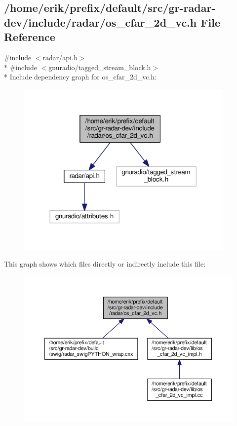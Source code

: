 \subsection{/home/erik/prefix/default/src/gr-\/radar-\/dev/include/radar/os\+\_\+cfar\+\_\+2d\+\_\+vc.h File Reference}
\label{os__cfar__2d__vc_8h}
{\ttfamily \#include $<$radar/api.\+h$>$}\\*
{\ttfamily \#include $<$gnuradio/tagged\+\_\+stream\+\_\+block.\+h$>$}\\*
Include dependency graph for os\+\_\+cfar\+\_\+2d\+\_\+vc.\+h\+:
\nopagebreak
\begin{figure}[H]
\begin{center}
\leavevmode
\includegraphics[width=302pt]{d8/dc2/os__cfar__2d__vc_8h__incl}
\end{center}
\end{figure}
This graph shows which files directly or indirectly include this file\+:
\nopagebreak
\begin{figure}[H]
\begin{center}
\leavevmode
\includegraphics[width=350pt]{d7/da9/os__cfar__2d__vc_8h__dep__incl}
\end{center}
\end{figure}
